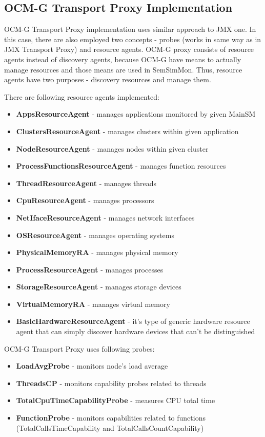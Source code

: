 \subsection{OCM-G Transport Proxy Implementation}

OCM-G Transport Proxy implementation uses similar approach to JMX one. In this case, there are also employed two concepts - probes (works in same way as in JMX Transport Proxy) and resource agents. OCM-G proxy consists of resource agents instead of discovery agents, because OCM-G have means to actually manage resources and those means are used in SemSimMon. Thus, resource agents have two purposes - discovery resources and manage them.

There are following resource agents implemented:

\begin{itemize} 
  \item{\bf{AppsResourceAgent}} - manages applications monitored by given MainSM
  \item{\bf{ClustersResourceAgent}} - manages clusters within given application
  \item{\bf{NodeResourceAgent}} - manages nodes within given cluster
  \item{\bf{ProcessFunctionsResourceAgent}} - manages function resources
  \item{\bf{ThreadResourceAgent}} - manages threads
  \item{\bf{CpuResourceAgent}} - manages processors
  \item{\bf{NetIfaceResourceAgent}} - manages network interfaces
  \item{\bf{OSResourceAgent}} - manages operating systems
  \item{\bf{PhysicalMemoryRA}} - manages physical memory
  \item{\bf{ProcessResourceAgent}} - manages processes
  \item{\bf{StorageResourceAgent}} - manages storage devices
  \item{\bf{VirtualMemoryRA}} - manages virtual memory
  \item{\bf{BasicHardwareResourceAgent}} - it\rq{}s type of generic hardware resource agent that can simply discover hardware devices that can\rq{}t be distinguished
\end{itemize} 
  
OCM-G Transport Proxy uses following probes:

\begin{itemize} 
  \item{\bf{LoadAvgProbe}} - monitors node\rq{}s load average 
  \item{\bf{ThreadsCP}} - monitors capability probes related to threads
  \item{\bf{TotalCpuTimeCapabilityProbe}} - measures CPU total time
  \item{\bf{FunctionProbe}} - monitors capabilities related to functions (TotalCallsTimeCapability and TotalCallsCountCapability)
\end{itemize} 

